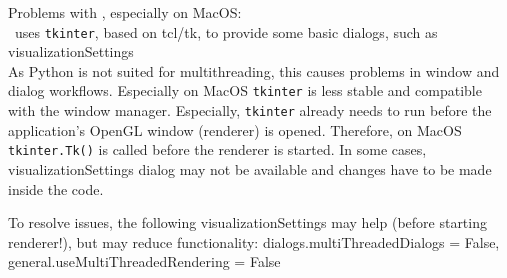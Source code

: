 \item Problems with , especially on MacOS:\\
  \codeName\ uses \texttt{tkinter}, based on tcl/tk, to provide some basic dialogs, such as visualizationSettings\\
  As Python is not suited for multithreading, this causes problems in window and dialog workflows. Especially on MacOS
  \texttt{tkinter} is less stable and compatible with the window manager. Especially, \texttt{tkinter} already needs to run
  before the application's OpenGL window (renderer) is opened. Therefore, on MacOS \texttt{tkinter.Tk()} is called before the 
  renderer is started.
  In some cases, visualizationSettings dialog may not be available and changes have to be made inside the code.
\item[$\ra$] To resolve issues, the following visualizationSettings may help (before starting renderer!), but may reduce functionality: 
  dialogs.multiThreadedDialogs = False, general.useMultiThreadedRendering = False
\ei 




